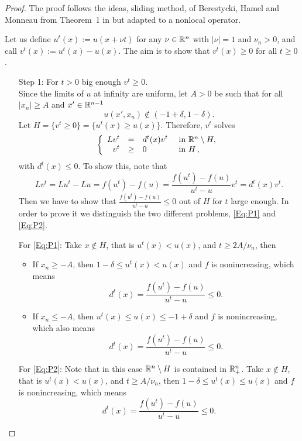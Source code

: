 \begin{proof}
The proof follows the ideas, sliding method, of Berestycki, Hamel and Monneau from Theorem~1 in \cite{BerestyckiHamelMonneau} but adapted to a nonlocal operator.

Let us define $ u^t(x) := u(x+\nu t) $ for any $\nu\in\mathbb{R}^n$ with $|\nu|=1$ and $\nu_n>0$, and call $v^t(x):=u^t(x)-u(x)$. The aim is to show that $v^t(x)\geq 0$ for all $t\geq 0$.

\begin{enumerate}
\item[Step 1:] For $t>0$ big enough $v^t\geq 0$.\\
Since the limits of $u$ at infinity are uniform, let $A>0$ be such that for all $|x_n|\geq A$ and $x'\in \mathbb{R}^{n-1}$
\begin{equation}
\label{Eq:DefinitionA}
u(x',x_n)\not\in (-1+\delta,1-\delta).
\end{equation}
Let $H=\{v^t\geq 0\} = \{u^t(x) \geq u(x)\}$. Therefore, $v^t$ solves
$$
\left\{\begin{array}{rcll}
L v^t &=& d^t(x) v^t  &\textrm{ in }\mathbb{R}^n\setminus H,\\
v^t &\geq& 0  &\textrm{ in } H\,,
\end{array} \right.
$$
with $d^t(x)\leq 0$. To show this, note that
\begin{equation}
\label{Eq:Definition_dt}
Lv^t = Lu^t - Lu = f(u^t) - f(u) = \frac{f(u^t) - f(u)}{u^t-u} v^t = d^t(x) v^t.
\end{equation}
Then we have to show that $ \frac{f(u^t) - f(u)}{u^t-u} \leq 0 $ out of $H$ for $t$ large enough. In order to prove it we distinguish the two different problems, \eqref{Eq:P1} and \eqref{Eq:P2}.

For \eqref{Eq:P1}: Take $x\not\in H$, that is $u^t(x)<u(x)$, and $t\geq 2A/\nu_n$, then
\begin{itemize}
\item If $x_n\geq -A$, then $1-\delta \leq u^t(x) < u(x)$ and $f$ is nonincreasing, which means
$$ d^t(x) = \frac{f(u^t) - f(u)}{u^t-u} \leq 0.  $$
\item If $x_n\leq -A$, then $u^t(x) \leq u(x) \leq -1+\delta$ and $f$ is nonincreasing, which also means
$$ d^t(x) = \frac{f(u^t) - f(u)}{u^t-u} \leq 0.  $$
\end{itemize}

For \eqref{Eq:P2}: Note that in this case $\mathbb{R}^n\setminus H$ is contained in $\mathbb{R}^n_+$. Take $x\not\in H$, that is $u^t(x)<u(x)$, and $t\geq A/\nu_n$, then $1-\delta \leq u^t(x) \leq u(x)$ and $f$ is nonincreasing, which means
$$ d^t(x) = \frac{f(u^t) - f(u)}{u^t-u} \leq 0.  $$


\end{enumerate}
\end{proof}
